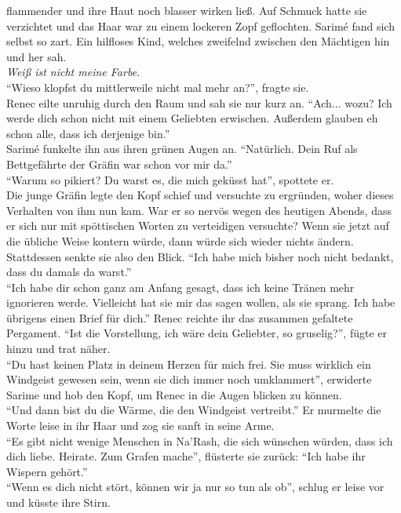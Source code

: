flammender und ihre Haut noch blasser wirken ließ. Auf Schmuck hatte sie verzichtet und das Haar 
war zu einem lockeren Zopf geflochten. Sarimé fand sich selbst so zart. Ein hilfloses Kind, welches 
zweifelnd zwischen den Mächtigen hin und her sah.\\
\textit{Weiß ist nicht meine Farbe.}\\
``Wieso klopfst du mittlerweile nicht mal mehr an?'', fragte sie.\\
Renec eilte unruhig durch den Raum und sah sie nur kurz an. ``Ach... wozu? Ich werde dich schon 
nicht mit einem Geliebten erwischen. Außerdem glauben eh schon alle, dass ich derjenige bin.''\\
Sarimé funkelte ihn aus ihren grünen Augen an. ``Natürlich. Dein Ruf als Bettgefährte der Gräfin 
war schon vor mir da.''\\
``Warum so pikiert? Du warst es, die mich geküsst hat'', spottete er.\\
Die junge Gräfin legte den Kopf schief und versuchte zu ergründen, woher dieses Verhalten von ihm 
nun kam. War er so nervös wegen des heutigen Abends, dass er sich nur mit spöttischen Worten zu 
verteidigen versuchte? Wenn sie jetzt auf die übliche Weise kontern würde, dann würde sich wieder 
nichts ändern. Stattdessen senkte sie also den Blick. ``Ich habe mich bisher noch nicht bedankt, 
dass du damals da warst.''\\
``Ich habe dir schon ganz am Anfang gesagt, dass ich keine Tränen mehr ignorieren werde. Vielleicht 
hat sie mir das sagen wollen, als sie sprang. Ich habe übrigens einen Brief für dich.'' Renec 
reichte ihr das zusammen gefaltete Pergament. ``Ist die Vorstellung, ich wäre dein Geliebter, so 
gruselig?'', fügte er hinzu und trat näher.\\
``Du hast keinen Platz in deinem Herzen für mich frei. Sie muss wirklich ein Windgeist gewesen 
sein, wenn sie dich immer noch umklammert'', erwiderte Sarime und hob den Kopf, um Renec in die 
Augen blicken zu können.\\
``Und dann bist du die Wärme, die den Windgeist vertreibt.'' Er murmelte die Worte leise in ihr 
Haar und zog sie sanft in seine Arme.\\
``Es gibt nicht wenige Menschen in Na'Rash, die sich wünschen würden, dass ich dich liebe. Heirate. 
Zum Grafen mache'', flüsterte sie zurück: ``Ich habe ihr Wispern gehört.''\\
``Wenn es dich nicht stört, können wir ja nur so tun als ob'', schlug er leise vor und küsste ihre 
Stirn.\\
